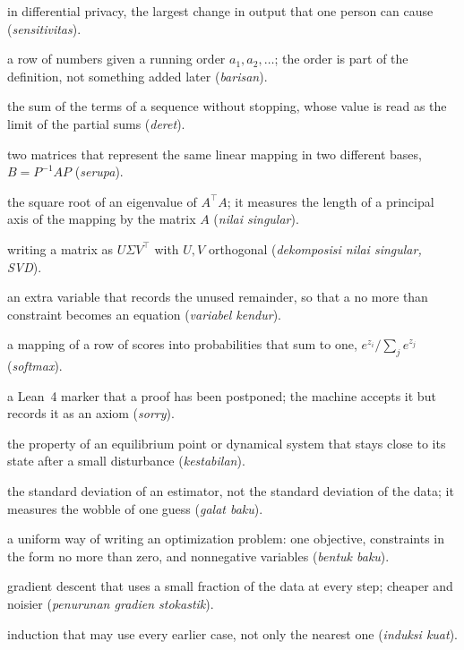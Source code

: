 \begin{description}[style=nextline,itemsep=0.35em]
  \item[Sensitivity] in differential privacy, the largest change in output that one person can cause (\emph{sensitivitas}).
  \item[Sequence] a row of numbers given a running order $a_1,a_2,\dots$; the order is part of the definition, not something added later (\emph{barisan}).
  \item[Series] the sum of the terms of a sequence without stopping, whose value is read as the limit of the partial sums (\emph{deret}).
  \item[Similar] two matrices that represent the same linear mapping in two different bases, $B=P^{-1}AP$ (\emph{serupa}).
  \item[Singular value] the square root of an eigenvalue of $A^{\top}A$; it measures the length of a principal axis of the mapping by the matrix $A$ (\emph{nilai singular}).
  \item[Singular value decomposition] writing a matrix as $U\Sigma V^{\top}$ with $U,V$ orthogonal (\emph{dekomposisi nilai singular, SVD}).
  \item[Slack variable] an extra variable that records the unused remainder, so that a no more than constraint becomes an equation (\emph{variabel kendur}).
  \item[Softmax] a mapping of a row of scores into probabilities that sum to one, $e^{z_i}/\sum_j e^{z_j}$ (\emph{softmax}).
  \item[Sorry] a Lean~4 marker that a proof has been postponed; the machine accepts it but records it as an axiom (\emph{sorry}).
  \item[Stability] the property of an equilibrium point or dynamical system that stays close to its state after a small disturbance (\emph{kestabilan}).
  \item[Standard error] the standard deviation of an estimator, not the standard deviation of the data; it measures the wobble of one guess (\emph{galat baku}).
  \item[Standard form] a uniform way of writing an optimization problem: one objective, constraints in the form no more than zero, and nonnegative variables (\emph{bentuk baku}).
  \item[Stochastic gradient descent] gradient descent that uses a small fraction of the data at every step; cheaper and noisier (\emph{penurunan gradien stokastik}).
  \item[Strong induction] induction that may use every earlier case, not only the nearest one (\emph{induksi kuat}).

\end{description}
